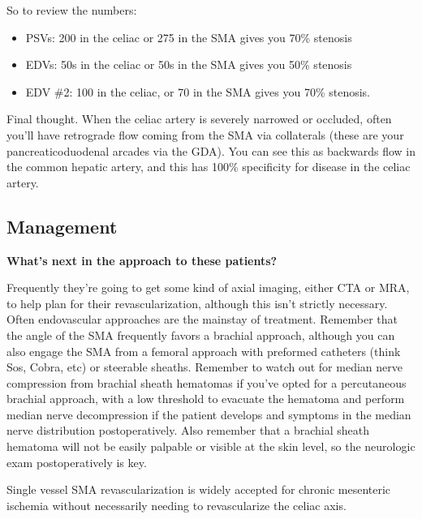 \documentclass[
]{book}
\begin{document}
So to review the numbers: \citep{monetaDuplexUltrasoundCriteria1991, monetaMesentericDuplexScanning1993, zwolakMesentericCeliacDuplex1998}

\begin{itemize}
\item
  PSVs: 200 in the celiac or 275 in the SMA gives you 70\% stenosis
\item
  EDVs: 50s in the celiac or 50s in the SMA gives you 50\% stenosis
\item
  EDV \#2: 100 in the celiac, or 70 in the SMA gives you 70\% stenosis.
\end{itemize}

Final thought. When the celiac artery is severely narrowed or occluded,
often you'll have retrograde flow coming from the SMA via collaterals
(these are your pancreaticoduodenal arcades via the GDA). You can see
this as backwards flow in the common hepatic artery, and this has 100\%
specificity for disease in the celiac
artery.\citep{warnckeSuperiorMesentericArtery2019}

\hypertarget{management-5}{%
\subsection{Management}\label{management-5}}

\textbf{What's next in the approach to these patients?}

Frequently they're going to get some kind of axial imaging, either CTA
or MRA, to help plan for their revascularization, although this isn't
strictly necessary. Often endovascular approaches are the mainstay of
treatment. Remember that the angle of the SMA frequently favors a
brachial approach, although you can also engage the SMA from a femoral
approach with preformed catheters (think Sos, Cobra, etc) or steerable
sheaths. Remember to watch out for median nerve compression from
brachial sheath hematomas if you've opted for a percutaneous brachial
approach, with a low threshold to evacuate the hematoma and perform
median nerve decompression if the patient develops and symptoms in the
median nerve distribution postoperatively. Also remember that a brachial
sheath hematoma will not be easily palpable or visible at the skin
level, so the neurologic exam postoperatively is key.

Single vessel SMA revascularization is widely accepted for chronic
mesenteric ischemia without necessarily needing to revascularize the
celiac axis. \citep{oderich132ChronicMesenteric2019, foleyRevascularizationSuperiorMesenteric2000}
\end{document}
